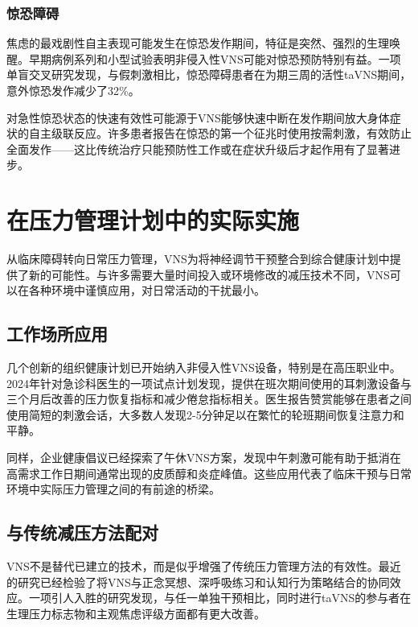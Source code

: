 \documentclass[
  Letterpaper,
]{scrbook}
\begin{document}
\subsubsection{惊恐障碍}\label{ux60caux6050ux969cux788d}

焦虑的最戏剧性自主表现可能发生在惊恐发作期间，特征是突然、强烈的生理唤醒。早期病例系列和小型试验表明非侵入性VNS可能对惊恐预防特别有益。一项单盲交叉研究发现，与假刺激相比，惊恐障碍患者在为期三周的活性taVNS期间，意外惊恐发作减少了32\%。

对急性惊恐状态的快速有效性可能源于VNS能够快速中断在发作期间放大身体症状的自主级联反应。许多患者报告在惊恐的第一个征兆时使用按需刺激，有效防止全面发作------这比传统治疗只能预防性工作或在症状升级后才起作用有了显著进步。

\section{在压力管理计划中的实际实施}\label{ux5728ux538bux529bux7ba1ux7406ux8ba1ux5212ux4e2dux7684ux5b9eux9645ux5b9eux65bd}

从临床障碍转向日常压力管理，VNS为将神经调节干预整合到综合健康计划中提供了新的可能性。与许多需要大量时间投入或环境修改的减压技术不同，VNS可以在各种环境中谨慎应用，对日常活动的干扰最小。

\subsection{工作场所应用}\label{ux5de5ux4f5cux573aux6240ux5e94ux7528}

几个创新的组织健康计划已开始纳入非侵入性VNS设备，特别是在高压职业中。2024年针对急诊科医生的一项试点计划发现，提供在班次期间使用的耳刺激设备与三个月后改善的压力恢复指标和减少倦怠指标相关。医生报告赞赏能够在患者之间使用简短的刺激会话，大多数人发现2-5分钟足以在繁忙的轮班期间恢复注意力和平静。

同样，企业健康倡议已经探索了午休VNS方案，发现中午刺激可能有助于抵消在高需求工作日期间通常出现的皮质醇和炎症峰值。这些应用代表了临床干预与日常环境中实际压力管理之间的有前途的桥梁。

\subsection{与传统减压方法配对}\label{ux4e0eux4f20ux7edfux51cfux538bux65b9ux6cd5ux914dux5bf9}

VNS不是替代已建立的技术，而是似乎增强了传统压力管理方法的有效性。最近的研究已经检验了将VNS与正念冥想、深呼吸练习和认知行为策略结合的协同效应。一项引人入胜的研究发现，与任一单独干预相比，同时进行taVNS的参与者在生理压力标志物和主观焦虑评级方面都有更大改善。
\end{document}
